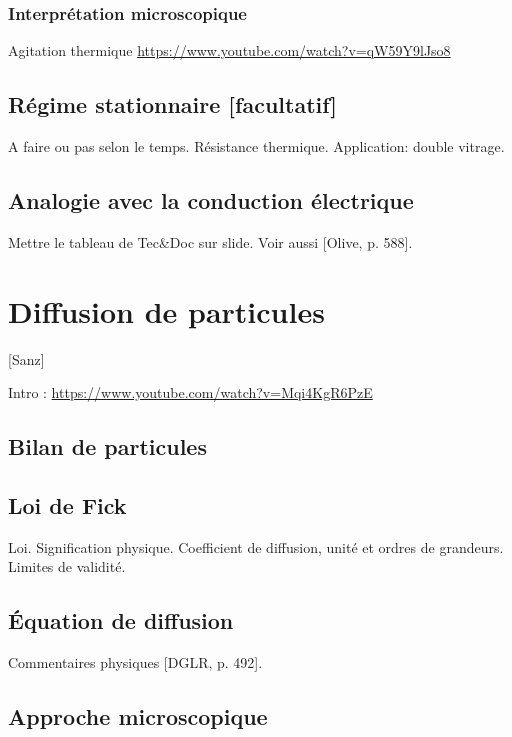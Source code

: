 \documentclass[11pt]{report}
\numberwithin{figure}{section}
\numberwithin{equation}{section}
\numberwithin{table}{section}
\newcommand{\1}{\boldsymbol{1}}
\begin{document}
\subsubsection{Interprétation microscopique}

Agitation thermique \url{https://www.youtube.com/watch?v=qW59Y9lJso8}

\subsection{Régime stationnaire [facultatif]}

A faire ou pas selon le temps. Résistance thermique. Application: double vitrage.

\subsection{Analogie avec la conduction électrique}

Mettre le tableau de Tec\&Doc sur slide. Voir aussi [Olive, p. 588].


\section{Diffusion de particules}

[Sanz]

Intro : \url{https://www.youtube.com/watch?v=Mqi4KgR6PzE}

\subsection{Bilan de particules}


\subsection{Loi de Fick}

Loi. Signification physique. Coefficient de diffusion, unité et ordres
de grandeurs. Limites de validité.

\subsection{Équation de diffusion}

Commentaires physiques [DGLR, p. 492].


\subsection{Approche microscopique}
\end{document}
